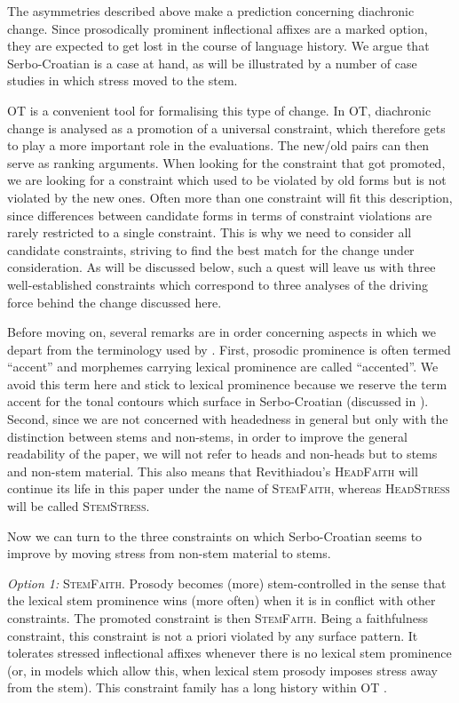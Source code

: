\documentclass[output=paper,modfonts,nonflat
]{langsci/langscibook}
\begin{document}
The asymmetries described above make a prediction concerning diachronic change. Since prosodically prominent inflectional affixes are a marked option, they are expected to get lost in the course of language history. We argue that Serbo-Croatian is a case at hand, as will be illustrated by a number of case studies in which stress moved to the stem.

OT is a convenient tool for formalising this type of change. In OT, diachronic change is analysed as a promotion of a universal constraint, which therefore gets to play a more important role in the evaluations. The new/old pairs can then serve as ranking arguments. When looking for the constraint that got promoted, we are looking for a constraint which used to be violated by old forms but is not violated by the new ones. Often more than one constraint will fit this description, since differences between candidate forms in terms of constraint violations are rarely restricted to a single constraint. This is why we need to consider all candidate constraints, striving to find the best match for the change under consideration. As will be discussed below, such a quest will leave us with three well-established constraints which correspond to three analyses of the driving force behind the change discussed here. 

Before moving on, several remarks are in order concerning aspects in which we depart from the terminology used by \citet{Revithiadou1999}. First, prosodic prominence is often termed ``accent'' and morphemes carrying lexical prominence are called ``accented''. We avoid this term here and stick to lexical prominence because we reserve the term accent for the tonal contours which surface in Serbo-Croatian (discussed in ). Second, since we are not concerned with headedness in general but only with the distinction between stems and non-stems, in order to improve the general readability of the paper, we will not refer to heads and non-heads but to stems and non-stem material. This also means that Revithiadou's \textsc{HeadFaith} will continue its life in this paper under the name of \textsc{StemFaith}, whereas  \textsc{HeadStress} will be called \textsc{StemStress}.

Now we can turn to the three constraints on which Serbo-Croatian seems to improve by moving stress from non-stem material to stems.

\textit{Option 1:} \textsc{StemFaith}. Prosody becomes (more) stem-controlled in the sense that the lexical stem prominence wins (more often) when it is in conflict with other constraints. The promoted constraint is then \textsc{StemFaith}. Being a faithfulness constraint, this constraint is not a priori violated by any surface pattern. It tolerates stressed inflectional affixes whenever there is no lexical stem prominence (or, in models which allow this, when lexical stem prosody imposes stress away from the stem). This constraint family has a long history within OT \citep[see also][]{Alderete2001}.
\end{document}

